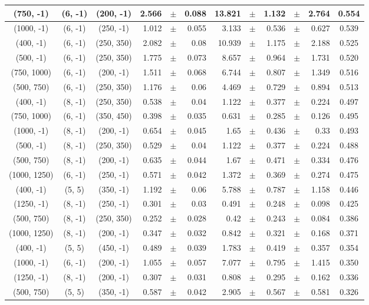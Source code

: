 \documentclass[12pt]{paper}
\begin{document}
\begin{table}[ht]
\begin{center}
{\begin{tabular}{|c|c|c|rrr|rrrrr|c|}
(750, -1)&(6, -1)&(200, -1)&2.566&$\pm$&0.088&13.821&$\pm$&1.132&$\pm$&2.764&0.554\\\hline
(1000, -1)&(6, -1)&(250, -1)&1.012&$\pm$&0.055&3.133&$\pm$&0.536&$\pm$&0.627&0.539\\\hline
(400, -1)&(6, -1)&(250, 350)&2.082&$\pm$&0.08&10.939&$\pm$&1.175&$\pm$&2.188&0.525\\\hline
(500, -1)&(6, -1)&(250, 350)&1.775&$\pm$&0.073&8.657&$\pm$&0.964&$\pm$&1.731&0.520\\\hline
(750, 1000)&(6, -1)&(200, -1)&1.511&$\pm$&0.068&6.744&$\pm$&0.807&$\pm$&1.349&0.516\\\hline
(500, 750)&(6, -1)&(250, 350)&1.176&$\pm$&0.06&4.469&$\pm$&0.729&$\pm$&0.894&0.513\\\hline
(400, -1)&(8, -1)&(250, 350)&0.538&$\pm$&0.04&1.122&$\pm$&0.377&$\pm$&0.224&0.497\\\hline
(750, 1000)&(6, -1)&(350, 450)&0.398&$\pm$&0.035&0.631&$\pm$&0.285&$\pm$&0.126&0.495\\\hline
(1000, -1)&(8, -1)&(200, -1)&0.654&$\pm$&0.045&1.65&$\pm$&0.436&$\pm$&0.33&0.493\\\hline
(500, -1)&(8, -1)&(250, 350)&0.529&$\pm$&0.04&1.122&$\pm$&0.377&$\pm$&0.224&0.488\\\hline
(500, 750)&(8, -1)&(200, -1)&0.635&$\pm$&0.044&1.67&$\pm$&0.471&$\pm$&0.334&0.476\\\hline
(1000, 1250)&(6, -1)&(250, -1)&0.571&$\pm$&0.042&1.372&$\pm$&0.369&$\pm$&0.274&0.475\\\hline
(400, -1)&(5, 5)&(350, -1)&1.192&$\pm$&0.06&5.788&$\pm$&0.787&$\pm$&1.158&0.446\\\hline
(1250, -1)&(8, -1)&(250, -1)&0.301&$\pm$&0.03&0.491&$\pm$&0.248&$\pm$&0.098&0.425\\\hline
(500, 750)&(8, -1)&(250, 350)&0.252&$\pm$&0.028&0.42&$\pm$&0.243&$\pm$&0.084&0.386\\\hline
(1000, 1250)&(8, -1)&(200, -1)&0.347&$\pm$&0.032&0.842&$\pm$&0.321&$\pm$&0.168&0.371\\\hline
(400, -1)&(5, 5)&(450, -1)&0.489&$\pm$&0.039&1.783&$\pm$&0.419&$\pm$&0.357&0.354\\\hline
(1000, -1)&(6, -1)&(200, -1)&1.055&$\pm$&0.057&7.077&$\pm$&0.795&$\pm$&1.415&0.350\\\hline
(1250, -1)&(8, -1)&(200, -1)&0.307&$\pm$&0.031&0.808&$\pm$&0.295&$\pm$&0.162&0.336\\\hline
(500, 750)&(5, 5)&(350, -1)&0.587&$\pm$&0.042&2.905&$\pm$&0.567&$\pm$&0.581&0.326\\\hline

\end{tabular}}
\end{center}
\end{table}
\end{document}
